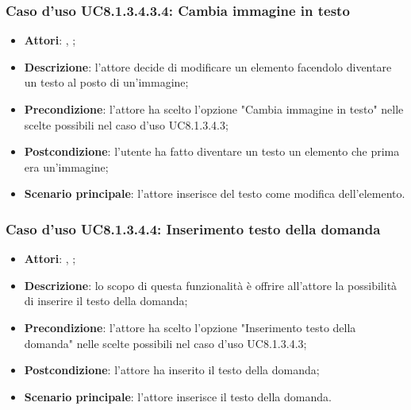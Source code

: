 		\subsubsection{Caso d'uso UC8.1.3.4.3.4: Cambia immagine in testo}
		\label{UC8.1.3.4.3.4}
		\begin{itemize}
			\item \textbf{Attori}: \uau, \uaupro;
			\item \textbf{Descrizione}: l'attore decide di modificare un elemento facendolo diventare un testo al posto di un'immagine;
			\item \textbf{Precondizione}: l'attore ha scelto l'opzione "Cambia immagine in testo" nelle scelte possibili nel caso d'uso UC8.1.3.4.3;
			\item \textbf{Postcondizione}: l'utente ha fatto diventare un testo un elemento che prima era un'immagine;
			\item \textbf{Scenario principale}: l'attore inserisce del testo come modifica dell'elemento.  
		\end{itemize}
		
	\subsubsection{Caso d'uso UC8.1.3.4.4: Inserimento testo della domanda}
	\begin{itemize}
		\item
		\textbf{Attori}: \uau, \uaupro;
		\item		
		\textbf{Descrizione}: lo scopo di questa funzionalità è offrire all'attore la possibilità di inserire il testo della domanda;
		\item
		\textbf{Precondizione}: l'attore ha scelto l'opzione "Inserimento testo della domanda" nelle scelte possibili nel caso d'uso UC8.1.3.4.3;
		\item \textbf{Postcondizione}: l'attore ha inserito il testo della domanda;
		\item \textbf{Scenario principale}: l'attore inserisce il testo della domanda. 
	\end{itemize}
